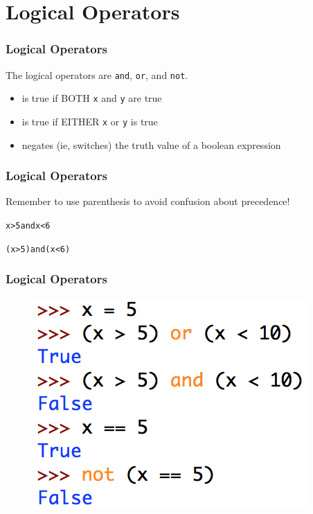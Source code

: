 \documentclass{beamer}
\begin{document}
\section{Logical Operators}

\begin{frame}[fragile]
\frametitle{Logical Operators}

The logical operators are \verb|and|, \verb|or|, and \verb|not|.
\begin{itemize}
\item {} is true if BOTH \verb|x| and \verb|y| are true
\item {} is true if EITHER \verb|x| or \verb|y| is true
\item {} negates (ie, switches) the truth value of a boolean expression
\end{itemize}
\end{frame}

\begin{frame}
\frametitle{Logical Operators}

Remember to use parenthesis to avoid confusion about precedence!
\begin{alltt}
x > 5 {\color{orange}and} x < 6

(x > 5) {\color{orange}and} (x < 6)
\end{alltt}
\end{frame}

\begin{frame}
\frametitle{Logical Operators}

\begin{figure}\centering
\includegraphics[scale=.8]{IMG/3.png}
\end{figure}
\end{frame}
\end{document}
